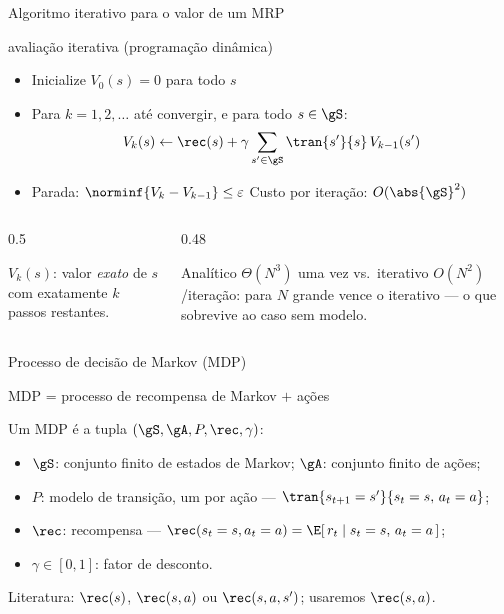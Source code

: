 \documentclass[aspectratio=169, 11pt]{beamer}
\begin{document}
\begin{frame}{Algoritmo iterativo para o valor de um MRP}
  \begin{algbox}{avaliação iterativa (programação dinâmica)}
    \begin{itemize}\setlength{\itemsep}{0.2ex}
      \item Inicialize $V_0(s) = 0$ para todo $s$
      \item Para $k = 1, 2, \dots$ até convergir, e para todo $s \in \gS$:
        \[ V_k(s) \leftarrow \rec(s) + \gamma \sum_{s' \in \gS} \tran{s'}{s}\, V_{k-1}(s') \]
      \item Parada: $\norminf{V_k - V_{k-1}} \le \varepsilon$ \quad
            {\small Custo por iteração: $O(\abs{\gS}^2)$}
    \end{itemize}
  \end{algbox}
  \vspace{-0.9em}
  \begin{columns}[T]
    \begin{column}{0.5\textwidth}
      \begin{ideiabox}
        $V_k(s)$: valor \emph{exato} de $s$ com exatamente $k$ passos restantes.
      \end{ideiabox}
    \end{column}
    \begin{column}{0.48\textwidth}
      \begin{alertabox}
        Analítico $\Theta(N^3)$ uma vez vs.\ iterativo $O(N^2)$/iteração: para $N$
        grande vence o iterativo --- o que sobrevive ao caso sem modelo.
      \end{alertabox}
    \end{column}
  \end{columns}
\end{frame}

\begin{frame}{Processo de decisão de Markov (MDP)}
  \begin{center}
    {\large MDP \;=\; processo de recompensa de Markov \;\alert{$+$ ações}}
  \end{center}
  \begin{defbox}{}
    Um MDP é a tupla $(\gS, \gA, P, \rec, \gamma)$:
    \begin{itemize}\setlength{\itemsep}{0.1ex}
      \item $\gS$: conjunto finito de estados de Markov; \quad $\gA$: conjunto finito de ações;
      \item $P$: modelo de transição, um por ação --- $\tran{s_{t+1}=s'}{s_t=s,\, a_t=a}$;
      \item $\rec$: recompensa --- $\rec(s_t=s, a_t=a) = \E[\, r_t \mid s_t=s,\, a_t=a \,]$;
      \item $\gamma \in [0,1]$: fator de desconto.
    \end{itemize}
  \end{defbox}
  \begin{alertabox}
    Literatura: $\rec(s)$, $\rec(s,a)$ ou $\rec(s,a,s')$; usaremos \alert{$\rec(s,a)$}.
  \end{alertabox}
\end{frame}
\end{document}
